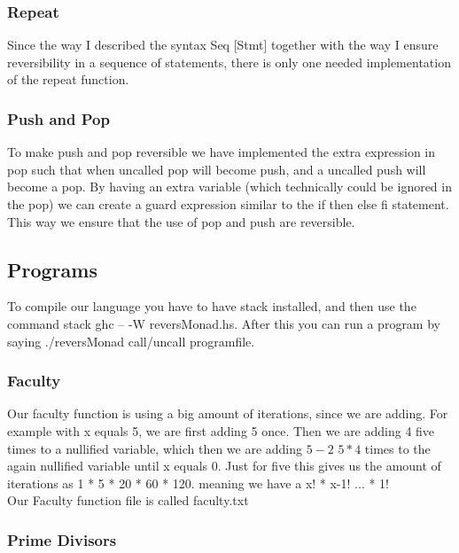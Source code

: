 \documentclass[10pt,a4paper]{article}      %
\begin{document}
\subsubsection*{Repeat}

Since the way I described the syntax Seq [Stmt] together with the way I ensure reversibility in a sequence of statements, there is only one needed implementation of the repeat function.


\subsubsection*{Push and Pop}

To make push and pop reversible we have implemented the extra expression in pop such that when uncalled pop will become push, and a uncalled push will become a pop. By having an extra variable (which technically could be ignored in the pop) we can create a guard expression similar to the if then else fi statement. This way we ensure that the use of pop and push are reversible.

\subsection*{Programs}

To compile our language you have to have stack installed, and then use the command stack ghc -- -W reversMonad.hs. After this you can run a program by saying ./reversMonad call/uncall programfile.

\subsubsection*{Faculty}

Our faculty function is using a big amount of iterations, since we are adding. For example with x equals 5, we are first adding 5 once. Then we are adding 4 five times to a nullified variable, which then we are adding $5-2$ $5 * 4$ times to the again nullified variable until x equals 0. Just for five this gives us the amount of iterations as 1 * 5 * 20 * 60 * 120. meaning we have a x! * x-1! ... * 1!
\\
Our Faculty function file is called faculty.txt

\subsubsection*{Prime Divisors}
\end{document}
